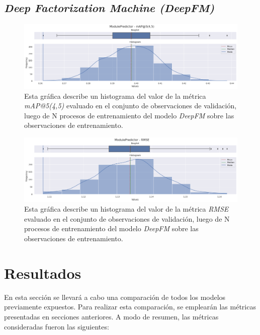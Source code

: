 \documentclass[11pt,a4paper,twoside]{thesis}
\begin{document}
\clearpage

\section{\textit{Deep Factorization Machine (DeepFM)}}

\begin{figure}[h!]
	\centering
	\includegraphics[width=15cm]{./images/metrics-DeepFM-mapk.png}
	\caption{Esta gráfica describe un histograma del valor de la métrica \textit{mAP@5(4,5)} evaluado en el conjunto de observaciones de validación, luego de N procesos de entrenamiento del modelo \textit{DeepFM} sobre las observaciones de entrenamiento.}
\end{figure}

\begin{figure}[h!]
	\centering
	\includegraphics[width=15cm]{./images/metrics-DeepFM-RMSE.png}
	\caption{Esta gráfica describe un histograma del valor de la métrica \textit{RMSE} evaluado en el conjunto de observaciones de validación, luego de N procesos de entrenamiento del modelo \textit{DeepFM} sobre las observaciones de entrenamiento.}
\end{figure}

\chapter{Resultados}

En esta sección se llevará a cabo una comparación de todos los modelos
previamente expuestos. Para realizar esta comparación, se emplearán las
métricas presentadas en secciones anteriores. A modo de resumen, las métricas
consideradas fueron las siguientes:
\end{document}
